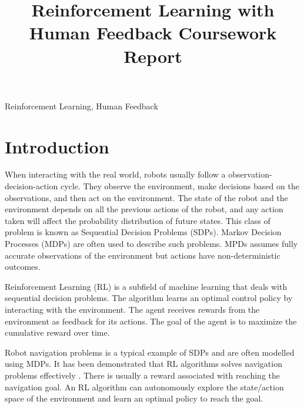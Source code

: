 \documentclass[conference]{IEEEtran}
\begin{document}
\title{Reinforcement Learning with Human Feedback Coursework Report}

\author{
}

\maketitle

\begin{abstract}

\end{abstract}

\begin{IEEEkeywords}
    Reinforcement Learning, Human Feedback
\end{IEEEkeywords}

\section{Introduction}

When interacting with the real world, robots usually follow a observation-decision-action cycle. They observe the environment, make decisions based on the observations, and then act on the environment. The state of the robot and the environment depends on all the previous actions of the robot, and any action taken will affect the probability distribution of future states. This class of problem is known as Sequential Decision Problems (SDPs). Markov Decision Processes (MDPs) \cite{putermanMarkovDecisionProcesses2014} are often used to describe such problems. MPDs assumes fully accurate observations of the environment but actions have non-deterministic outcomes.

Reinforcement Learning (RL) is a subfield of machine learning that deals with sequential decision problems. The algorithm learns an optimal control policy by interacting with the environment. The agent receives rewards from the environment as feedback for its actions. The goal of the agent is to maximize the cumulative reward over time.

Robot navigation problems is a typical example of SDPs and are often modelled using MDPs. It has been demonstrated that RL algorithms solves navigation problems effectively \cite{zhuDeepReinforcementLearning2021}. There is usually a reward associated with reaching the navigation goal. An RL algorithm can autonomously explore the state/action space of the environment and learn an optimal policy to reach the goal.
\end{document}
